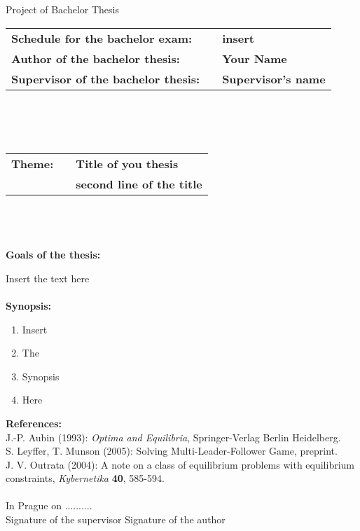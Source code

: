\pagestyle{empty}
\begin{center}
\LARGE{Project of Bachelor Thesis}
\end{center}
\vspace{5mm}
\begin{tabular}{lcl}
\large{\bf Schedule for the bachelor exam:} & & \large{\bf insert}\\
\large{\bf Author of the bachelor thesis:} & & \large{\bf Your Name}\\
\large{\bf Supervisor of the bachelor thesis:} & & \large{\bf Supervisor's name}
\end{tabular}
\\
\\
\\
\begin{tabular}{lcl}
\large{\bf Theme:} & & \large{\bf Title of you thesis}\\
 & & \large{\bf second line of the title}
\end{tabular}\\
\\
\\
\large{\bf Goals of the thesis:}
\par Insert the text here
\\
\\
\large{\bf Synopsis:}
\begin{enumerate}
\item Insert
 \item The \item Synopsis
 \item Here
\end{enumerate}
\medskip
\large{\bf References:}\\
\rbrack \hspace{1pt} J.-P. Aubin (1993): \textit{Optima
and Equilibria},
Springer-Verlag Berlin Heidelberg. \\
\rbrack \hspace{1pt} S. Leyffer, T. Munson (2005):
Solving Multi-Leader-Follower
Game, pre\-print. \\
\rbrack \hspace{1pt} J. V. Outrata (2004): A note on a
class of equilibrium problems with equilibrium constraints,
\textit{Kybernetika} \textbf{40}, 585-594.
\\
\vspace{15mm}\\
In Prague on ..........\newline \\
Signature of the supervisor \hspace{30mm} Signature of the author
